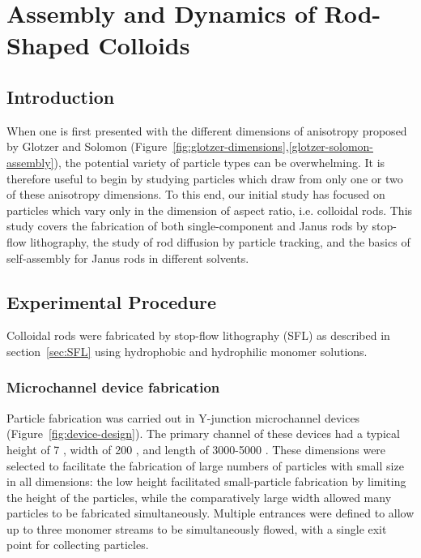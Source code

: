 \chapter{Assembly and Dynamics of Rod-Shaped Colloids}
\section{Introduction}

When one is first presented with the different dimensions of anisotropy proposed by 
Glotzer and Solomon (Figure~\ref{fig:glotzer-dimensions},\ref{glotzer-solomon-assembly}), the
potential variety of particle types can be overwhelming. It is therefore useful to begin by studying 
particles which draw from only one or two of these anisotropy dimensions. To this end, our
initial study has focused on particles which vary only in the dimension of 
aspect ratio, i.e. colloidal rods. This study covers the fabrication of both single-component and 
Janus rods by stop-flow lithography, the study of rod diffusion by particle tracking, and the basics
of self-assembly for Janus rods in different solvents.


\section{Experimental Procedure}

Colloidal rods were fabricated by stop-flow lithography (SFL) as described in section~\ref{sec:SFL} using
hydrophobic and hydrophilic monomer solutions.  

\subsection{Microchannel device fabrication}


Particle fabrication was carried out in Y-junction microchannel devices (Figure~\ref{fig:device-design}).
The primary channel of these devices had a typical 
height of 7 \microns, width of 200 \microns, and length of 3000-5000 \microns. These dimensions were selected
to facilitate the fabrication of large numbers of particles with small size in all dimensions: the low height
facilitated small-particle fabrication by limiting the height of the particles, while the comparatively large
width allowed many particles to be fabricated simultaneously. Multiple entrances were defined to allow up to three
monomer streams to be simultaneously flowed, with a single exit point for collecting particles.

